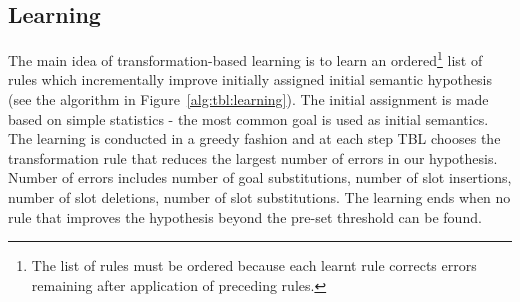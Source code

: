 \documentclass{article}
\begin{document}

\subsection{Learning} \label{sec:tbl:learning}
The main idea of transformation-based learning is to learn an ordered\footnote{The list of rules must be ordered because each learnt rule corrects errors remaining after application of preceding rules.} list of rules which incrementally improve initially assigned initial semantic hypothesis (see the algorithm in Figure~\ref{alg:tbl:learning}). The initial assignment is made based on simple statistics - the most common goal is used as initial semantics. The learning is conducted in a greedy fashion and at each step TBL chooses the transformation rule that reduces the largest number of errors in our hypothesis. Number of errors includes number of goal substitutions, number of slot insertions, number of slot deletions, number of slot substitutions. The learning ends when no rule that improves the hypothesis beyond the pre-set threshold can be found.

\end{document}
